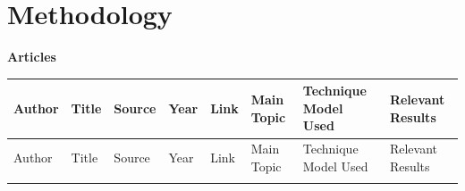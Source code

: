 \section{Methodology}
\label{sec:methodology}
\begin{landscape}
    \begin{center}
        \Large \textbf{Articles}\\[1em]
    \end{center}
    
    \small
    
    \begin{longtable}{p{2.0cm} p{4cm} p{1.0cm} p{1.0cm} p{3.0cm} p{3cm} p{2.0cm} p{3.0cm}}
        \toprule
        Author & Title & Source & Year & Link & Main Topic & Technique Model Used & Relevant Results \\
        \midrule
        \endfirsthead
    
        \toprule
        Author & Title & Source & Year & Link & Main Topic & Technique Model Used & Relevant Results \\
        \midrule
        \endhead
    
        \bottomrule
        \endfoot
    

\end{longtable}
\end{landscape}
